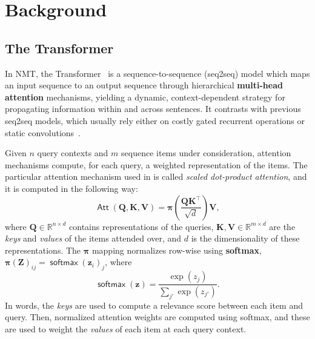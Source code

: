 \documentclass[11pt,a4paper]{article}
\newcommand{\tr}{\top}
\newcommand{\amap}{\bm{\pi}}
\newcommand{\reals}{\mathbb{R}}
\DeclareMathOperator*{\softmax}{\mathsf{softmax}}
\DeclareMathOperator{\att}{\mathsf{Att}}
\begin{document}
\section{Background}
\subsection{The Transformer}

In NMT, the Transformer~\citep{vaswani2017attention} is a
sequence-to-sequence (seq2seq) model which maps an input sequence to
an output sequence through hierarchical \textbf{multi-head attention}
mechanisms, yielding a dynamic, context-dependent strategy for
propagating information within and across sentences. It contrasts
with previous seq2seq models, which usually rely either on costly
gated recurrent operations \citep[often
LSTMs:][]{bahdanau2014neural,luong2015effective} or static
convolutions~\citep{convseq}.

Given $n$ query contexts and $m$ sequence items under consideration,
attention mechanisms compute, for each query, a weighted
representation of the items. The particular attention mechanism used
in \citet{vaswani2017attention} is called \emph{scaled dot-product
attention}, and it is computed in the following way:
\begin{equation}
    \att(\bm{Q}, \bm{K}, \bm{V}) = \amap
\left(\frac{\bm{Q}\bm{K}^\tr}{\sqrt{d}}\right) \bm{V},
    \label{eq:att_scaled_dot}
\end{equation}
where $\bm{Q} \in \reals^{n \times d}$ contains representations of the
queries, $\bm{K}, \bm{V} \in \reals^{m \times d}$
are the \emph{keys} and \emph{values} of the items attended over,
and $d$ is the dimensionality of these
representations.
The $\amap$ mapping normalizes row-wise using \textbf{softmax},
$\amap(\bm{Z})_{ij} = \softmax(\bm{z}_i)_j$, where
\begin{equation}\label{eq:softmax}
    \softmax(\bm{z}) = \frac{\exp(z_j)}{\sum_{j'} \exp(z_{j'})}.
\end{equation}
In words, the \emph{keys} are used to compute a relevance score
between each item and query. Then, normalized attention weights are computed
using softmax, and these are used to weight the \emph{values} of each item at each
query context.
\end{document}

